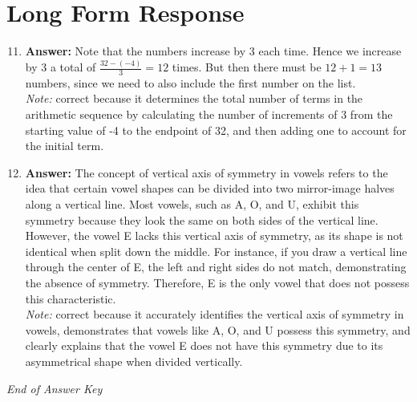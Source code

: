 \documentclass[12pt]{article}
\begin{document}
\section*{Long Form Response}
\begin{enumerate}[label=\arabic*.]
\setcounter{enumi}{10}
\item \textbf{Answer:} Note that the numbers increase by 3 each time. Hence we increase by 3 a total of $\frac{32 - (-4)}{3} = 12$ times. But then there must be $12 + 1 = \boxed{13}$ numbers, since we need to also include the first number on the list.
\\ \textit{Note:} correct because it determines the total number of terms in the arithmetic sequence by calculating the number of increments of 3 from the starting value of -4 to the endpoint of 32, and then adding one to account for the initial term.
\item \textbf{Answer:} The concept of vertical axis of symmetry in vowels refers to the idea that certain vowel shapes can be divided into two mirror-image halves along a vertical line. Most vowels, such as A, O, and U, exhibit this symmetry because they look the same on both sides of the vertical line. However, the vowel E lacks this vertical axis of symmetry, as its shape is not identical when split down the middle. For instance, if you draw a vertical line through the center of E, the left and right sides do not match, demonstrating the absence of symmetry. Therefore, E is the only vowel that does not possess this characteristic.
\\ \textit{Note:} correct because it accurately identifies the vertical axis of symmetry in vowels, demonstrates that vowels like A, O, and U possess this symmetry, and clearly explains that the vowel E does not have this symmetry due to its asymmetrical shape when divided vertically.
\end{enumerate}

\vfill
\noindent\textit{End of Answer Key}
\end{document}
